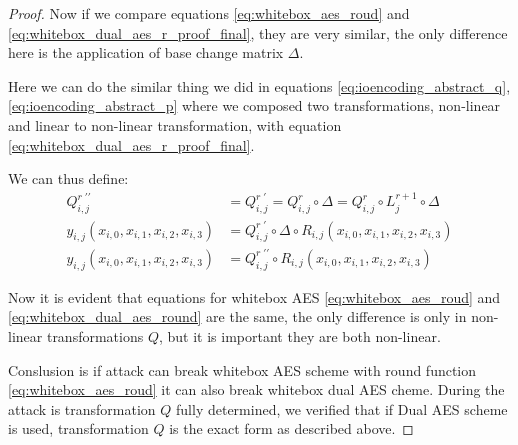 \documentclass[11pt,oneside,final]{fithesis2}
\begin{document}
\begin{proof}
	Now if we compare equations \ref{eq:whitebox_aes_roud} and \ref{eq:whitebox_dual_aes_r_proof_final}, they are very similar, 
	the only difference here is the application of base change matrix $\Delta$.

	Here we can do the similar thing we did in equations \ref{eq:ioencoding_abstract_q}, \ref{eq:ioencoding_abstract_p} where we composed
	two transformations, non-linear and linear to non-linear transformation, with equation \ref{eq:whitebox_dual_aes_r_proof_final}. 

	We can thus define:
	\begin{align}
	    Q^{r \; \prime\prime}_{i,j} &= Q^{r \; \prime}_{i,j} = Q^{r}_{i,j} \circ \Delta = Q^{r}_{i,j} \circ L^{r+1}_{j} \circ \Delta \\
	    y_{i,j}\left(x_{i,0}, x_{i,1}, x_{i,2}, x_{i,3}\right) &= Q^{r \; \prime}_{i,j}       \circ \Delta \circ R_{i,j}\left(x_{i,0}, x_{i,1}, x_{i,2}, x_{i,3}\right) \\
	    y_{i,j}\left(x_{i,0}, x_{i,1}, x_{i,2}, x_{i,3}\right) &= Q^{r \; \prime\prime}_{i,j} \circ R_{i,j}\left(x_{i,0}, x_{i,1}, x_{i,2}, x_{i,3}\right) \label{eq:whitebox_dual_aes_round}
	\end{align}

	Now it is evident that equations for whitebox AES \ref{eq:whitebox_aes_roud} and \ref{eq:whitebox_dual_aes_round} are the same, the only difference is only in non-linear 
	transformations $Q$, but it is important they are both non-linear. 

	Conslusion is if attack can break whitebox AES scheme with round function \ref{eq:whitebox_aes_roud} it can also break whitebox dual AES cheme. During the attack is transformation $Q$ 
	fully determined, we verified that if Dual AES scheme is used, transformation $Q$ is the exact form as described above.
	\end{proof}
\end{document}
